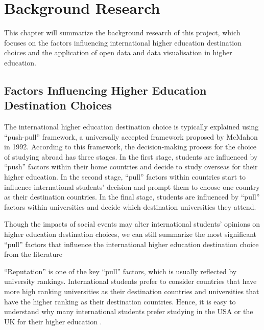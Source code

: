
\chapter{Background Research} \label{Chapter:Background Research}

This chapter will summarize the background research of this project, which focuses on the factors influencing international higher education destination choices and the application of open data and data visualisation in higher education. 

\section{Factors Influencing Higher Education Destination Choices
}

The international higher education destination choice is typically explained using “push-pull” framework, a universally accepted framework proposed by McMahon \cite{mcmahon1992higher} in 1992. According to this framework, the decision-making process for the choice of studying abroad has three stages. In the first stage, students are influenced by “push” factors within their home countries and decide to study overseas for their higher education. In the second stage, “pull” factors within countries start to influence international students’ decision and prompt them to choose one country as their destination countries. In the final stage, students are influenced by “pull” factors within universities and decide which destination universities they attend. 

Though the impacts of social events may alter international students’ opinions on higher education destination choices, we can still summarize the most significant “pull” factors that influence the international higher education destination choice from the literature \cite{mazzarol2002push, maringe2007international,petruzzellis2010educational, gong2015chinese} 

“Reputation” is one of the key “pull” factors, which is usually reflected by university rankings. International students prefer to consider countries that have more high ranking universities as their destination countries and universities that have the higher ranking as their destination countries. Hence, it is easy to understand why many international students prefer studying in the USA or the UK for their higher education \cite{mazzarol2002push}.  

